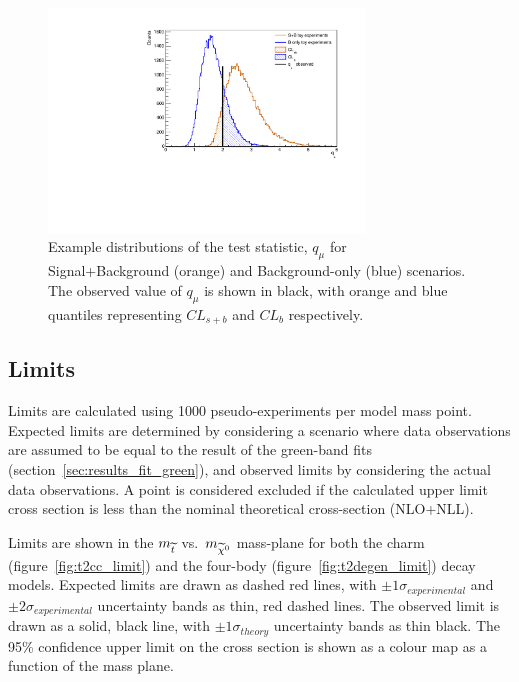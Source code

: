 \begin{figure}[t]
  \centering
  \includegraphics[width=0.75\textwidth]{Figs/other_limits/cartoon_cls_obs.pdf}
  \caption{Example distributions of the test statistic, $q_{\mu}$ for
  Signal+Background (orange) and Background-only (blue) scenarios. The observed
  value of $q_{\mu}$ is shown in black, with orange and blue quantiles
  representing $CL_{s+b}$ and $CL_{b}$ respectively.}
  \label{fig:cartoon_cls_obs}
\end{figure}

\subsection{Limits}
Limits are calculated using 1000 pseudo-experiments per model mass point.
Expected limits are determined by considering a scenario where data observations
are assumed to be equal to the result of the green-band fits
(section~\ref{sec:results_fit_green}), and observed
limits by considering the actual data observations.
A point is considered excluded if the calculated upper limit cross section is
less than the nominal theoretical cross-section (NLO+NLL).

Limits are shown in the $m_{\widetilde{t}} $ vs.\ $m_{\widetilde{\chi}^{0}}$ mass-plane for both the
charm (figure~\ref{fig:t2cc_limit}) and the four-body
(figure~\ref{fig:t2degen_limit}) decay models. Expected limits are drawn as
dashed red lines,
with $\pm1\sigma_{experimental}$ and $\pm2\sigma_{experimental}$ uncertainty
bands as thin, red dashed lines. The observed limit is drawn as a solid, black
line, with $\pm1\sigma_{theory}$ uncertainty bands as thin black. The 95\%
confidence upper limit on the cross section is shown as a colour map as a
function of the mass plane.

